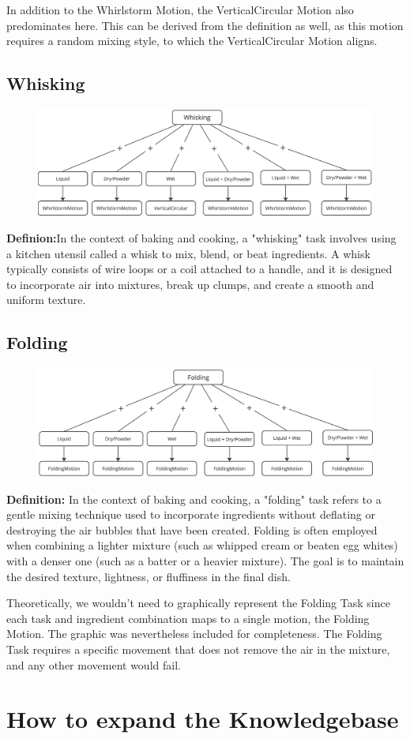 In addition to the Whirlstorm Motion, the VerticalCircular Motion also predominates here. This can be derived from the definition as well, as this motion requires a random mixing style, to which the VerticalCircular Motion aligns.
\subsection*{Whisking}
\begin{figure}[H]
    \includegraphics[scale=0.18]{Graphics/WhiskingDecisionTree.jpg}
    \end{figure}
\textbf{Definion:}In the context of baking and cooking, a "whisking" task involves using a kitchen utensil called a whisk to mix, blend, or beat ingredients. A whisk typically consists of wire loops or a coil attached to a handle, and it is designed to incorporate air into mixtures, break up clumps, and create a smooth and uniform texture.

\subsection*{Folding}
\begin{figure}[H]
    \includegraphics[scale=0.18]{Graphics/FoldingDecisionTree.jpg}
    \end{figure}
\textbf{Definition:}
In the context of baking and cooking, a "folding" task refers to a gentle mixing technique used to incorporate ingredients without deflating or destroying the air bubbles that have been created. Folding is often employed when combining a lighter mixture (such as whipped cream or beaten egg whites) with a denser one (such as a batter or a heavier mixture). The goal is to maintain the desired texture, lightness, or fluffiness in the final dish.

Theoretically, we wouldn't need to graphically represent the Folding Task since each task and ingredient combination maps to a single motion, the Folding Motion. The graphic was nevertheless included for completeness. The Folding Task requires a specific movement that does not remove the air in the mixture, and any other movement would fail.
\section*{How to expand the Knowledgebase}